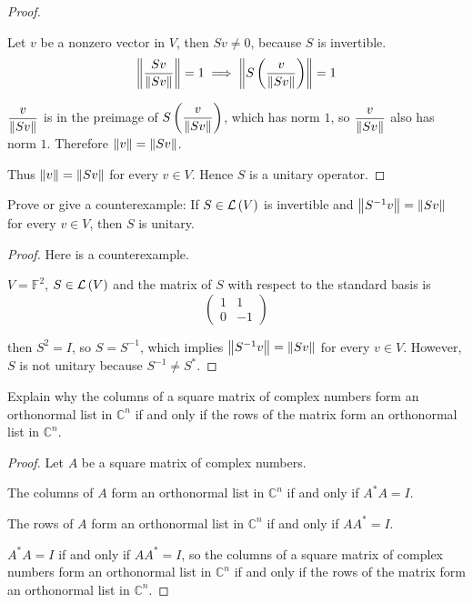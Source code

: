 \begin{proof}
\begin{enumerate}[label={(\roman*)}]
              Let $v$ be a nonzero vector in $V$, then $Sv\ne 0$, because $S$ is invertible.
              \[
                  \left\Vert{\frac{Sv}{\left\Vert{Sv}\right\Vert}}\right\Vert = 1 \implies \left\Vert{S\left(\frac{v}{\left\Vert{Sv}\right\Vert}\right)}\right\Vert = 1
              \]

              $\dfrac{v}{\left\Vert{Sv}\right\Vert}$ is in the preimage of $S\left(\dfrac{v}{\left\Vert{Sv}\right\Vert}\right)$, which has norm $1$, so $\dfrac{v}{\left\Vert{Sv}\right\Vert}$ also has norm $1$. Therefore $\left\Vert{v}\right\Vert = \left\Vert{Sv}\right\Vert$.
    \end{enumerate}

    Thus $\left\Vert{v}\right\Vert = \left\Vert{Sv}\right\Vert$ for every $v\in V$. Hence $S$ is a unitary operator.
\end{proof}
\newpage

\begin{exercise}
    Prove or give a counterexample: If $S\in\mathcal{L}\left({V}\right)$ is invertible and $\left\Vert{S^{-1}v}\right\Vert = \left\Vert{Sv}\right\Vert$ for every $v\in V$, then $S$ is unitary.
\end{exercise}

\begin{proof}
    Here is a counterexample.

    $V = \mathbb{F}^{2}$, $S\in\mathcal{L}\left({V}\right)$ and the matrix of $S$ with respect to the standard basis is
    \[
        \begin{pmatrix}
            1 & 1  \\
            0 & -1
        \end{pmatrix}
    \]

    then $S^{2} = I$, so $S = S^{-1}$, which implies $\left\Vert{S^{-1}v}\right\Vert = \left\Vert{Sv}\right\Vert$ for every $v\in V$. However, $S$ is not unitary because $S^{-1}\ne S^{*}$.
\end{proof}
\newpage

\begin{exercise}
    Explain why the columns of a square matrix of complex numbers form an orthonormal list in $\mathbb{C}^{n}$ if and only if the rows of the matrix form an orthonormal list in $\mathbb{C}^{n}$.
\end{exercise}

\begin{proof}
    Let $A$ be a square matrix of complex numbers.

    The columns of $A$ form an orthonormal list in $\mathbb{C}^{n}$ if and only if $A^{*}A = I$.

    The rows of $A$ form an orthonormal list in $\mathbb{C}^{n}$ if and only if $AA^{*} = I$.

    $A^{*}A = I$ if and only if $AA^{*} = I$, so the columns of a square matrix of complex numbers form an orthonormal list in $\mathbb{C}^{n}$ if and only if the rows of the matrix form an orthonormal list in $\mathbb{C}^{n}$.
\end{proof}
\newpage

